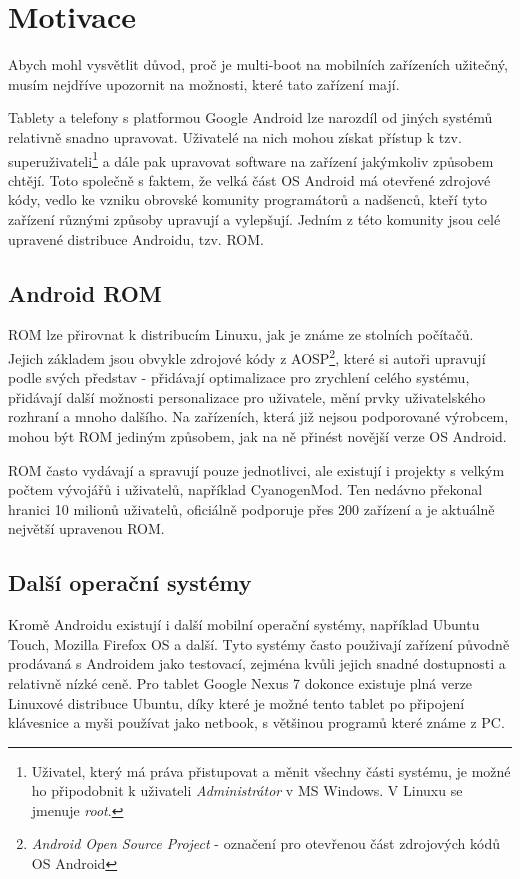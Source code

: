 \documentclass[12pt, a4paper, oneside]{article}
\newcommand{\It}{\textit}  %
\begin{document}
\section{Motivace}
Abych mohl vysvětlit důvod, proč je multi-boot na mobilních zařízeních užitečný, musím nejdříve upozornit na možnosti, které tato zařízení mají.

Tablety a telefony s platformou Google Android lze narozdíl od jiných systémů relativně snadno upravovat. Uživatelé na nich mohou získat přístup k tzv. superuživateli\footnote{Uživatel, který má práva přistupovat a měnit všechny části systému, je možné ho připodobnit k uživateli \It{Administrátor} v MS Windows. V Linuxu se jmenuje \It{root}.} a dále pak upravovat software na zařízení jakýmkoliv způsobem chtějí. Toto společně s faktem, že velká část OS Android má otevřené zdrojové kódy, vedlo ke vzniku obrovské komunity programátorů a nadšenců, kteří tyto zařízení různými způsoby upravují a vylepšují. Jedním z  této komunity jsou celé upravené distribuce Androidu, tzv. ROM.

\subsection{Android ROM}
ROM lze přirovnat k distribucím Linuxu, jak je známe ze stolních počítačů. Jejich základem jsou obvykle zdrojové kódy z AOSP\cite{aosp}\footnote{\It{Android Open Source Project} - označení pro otevřenou část zdrojových kódů OS Android}, které si autoři upravují podle svých představ - přidávají optimalizace pro zrychlení celého systému, přidávají další možnosti personalizace pro uživatele, mění prvky uživatelského rozhraní a mnoho dalšího. Na zařízeních, která již nejsou podporované výrobcem, mohou být ROM jediným způsobem, jak na ně přinést novější verze OS Android.

ROM často vydávají a spravují pouze jednotlivci, ale existují i projekty s velkým počtem vývojářů i uživatelů, například CyanogenMod\cite{CM}. Ten nedávno překonal hranici 10 milionů uživatelů, oficiálně podporuje přes 200 zařízení a je aktuálně největší upravenou ROM.

\subsection{Další operační systémy}
Kromě Androidu existují i další mobilní operační systémy, například Ubuntu Touch\cite{utouch}, Mozilla Firefox OS\cite{firefoxos} a další. Tyto systémy často použivají zařízení původně prodávaná s Androidem jako testovací, zejména kvůli jejich snadné dostupnosti a relativně nízké ceně. Pro tablet Google Nexus 7 dokonce existuje plná verze Linuxové distribuce Ubuntu, díky které je možné tento tablet po připojení klávesnice a myši používat jako netbook, s většinou programů které známe z PC.
\end{document}
